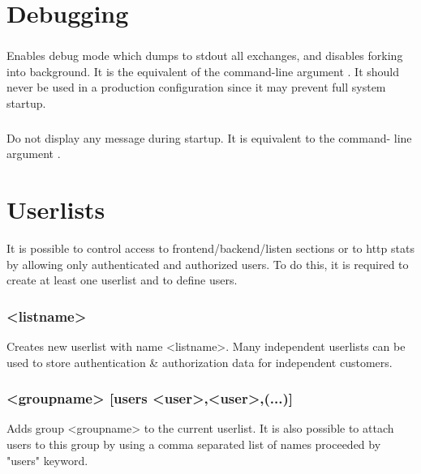 \section{Debugging}
\label{sec:debugging}

\subsubsection[debug]{}

Enables debug mode which dumps to stdout all exchanges, and disables forking
into background. It is the equivalent of the command-line argument . It
should never be used in a production configuration since it may prevent full
system startup.

\subsubsection[quiet]{}

Do not display any message during startup. It is equivalent to the command-
line argument .

\section{Userlists}
\label{sec:userlists}

It is possible to control access to frontend/backend/listen sections or to
http stats by allowing only authenticated and authorized users. To do this,
it is required to create at least one userlist and to define users.

\subsubsection[userlist]{ <listname>}

Creates new userlist with name <listname>. Many independent userlists can be
used to store authentication \& authorization data for independent customers.

\subsubsection[group]{ <groupname> [users <user>,<user>,(...)]}

Adds group <groupname> to the current userlist. It is also possible to
attach users to this group by using a comma separated list of names
proceeded by "users" keyword.

